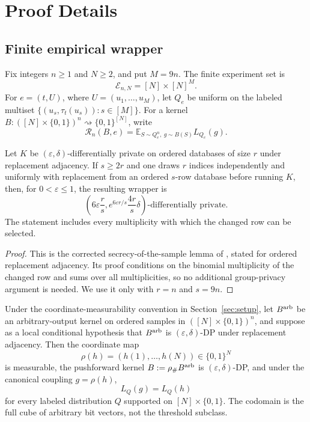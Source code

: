 \appendix

\section{Proof Details}
\label{sec:proof-details}

\subsection{Finite empirical wrapper}
\label{app:step-001}

Fix integers $n\geq1$ and $N\geq2$, and put $M=9n$.  The finite
experiment set is
\[
\mathcal E_{n,N}=[N]\times[N]^M.
\]
For $e=(t,U)$, where $U=(u_1,\ldots,u_M)$, let $Q_e$ be uniform on
the labeled multiset $\{(u_s,\tau_t(u_s)):s\in[M]\}$.  For a kernel
$B:([N]\times\{0,1\})^n\rightsquigarrow\{0,1\}^{[N]}$, write
\[
\mathcal R_n(B,e)
=\mathbb E_{S\sim Q_e^n,\ g\sim B(S)}L_{Q_e}(g).
\]

\begin{lemma}
\label{lem:secrecy-wrapper}
Let $K$ be $(\varepsilon,\delta)$-differentially private on ordered
databases of size $r$ under replacement adjacency.  If $s\geq2r$ and
one draws $r$ indices independently and uniformly with replacement from
an ordered $s$-row database before running $K$, then, for
$0<\varepsilon\leq1$, the resulting wrapper is
\[
\left(6\varepsilon\frac rs,
e^{6\varepsilon r/s}\frac{4r}{s}\delta\right)
\text{-differentially private}.
\tag{C1}\label{eq:step-001-c1}
\]
The statement includes every multiplicity with which the changed row can
be selected.
\end{lemma}
\begin{proof}
This is the corrected secrecy-of-the-sample lemma of
\citet{bunEtAl2015thresholds}, stated for ordered replacement adjacency.
Its proof conditions on the binomial multiplicity of the changed row and
sums over all multiplicities, so no additional group-privacy argument is
needed.  We use it only with $r=n$ and $s=9n$.
\end{proof}



\begin{lemma}
\label{lem:step-001-finite-restriction}

Under the coordinate-measurability convention in Section~\ref{sec:setup}, let \(B^{\rm arb}\) be an arbitrary-output kernel on ordered samples in \(([N] \times \{0,1\})^n\), and suppose as a local conditional hypothesis that \(B^{\rm arb}\) is \((\varepsilon,\delta)\)-DP under replacement adjacency. Then the coordinate map
\[
\rho(h)=(h(1),\ldots,h(N))\in\{0,1\}^N
\tag{1}\label{eq:step-001-1}
\]
is measurable, the pushforward kernel \(B:=\rho_\# B^{\rm arb}\) is \((\varepsilon,\delta)\)-DP, and under the canonical coupling \(g=\rho(h)\),
\[
L_Q(g)=L_Q(h)
\tag{2}\label{eq:step-001-2}
\]
for every labeled distribution \(Q\) supported on \([N] \times \{0,1\}\). The codomain is the full cube of arbitrary bit vectors, not the threshold subclass.

\end{lemma}

